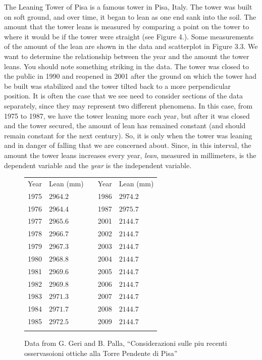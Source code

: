 \documentclass[10pt,]{book}
\theoremstyle{ptxdefinitionnotitle}
\theoremstyle{ptxdefinitiontitle}
\numberwithin{equation}{section}
\newcommand{\hrulemedium}{\noalign{\hrule height 0.07em}}
\begin{document}
\begin{example}\label{example-3}
\hypertarget{p-88}{}%
The Leaning Tower of Pisa is a famous tower in Pisa, Italy. The tower was built on soft ground, and over time, it began to lean as one end sank into the soil. The amount that the tower leans is measured by comparing a point on the tower to where it would be if the tower were straight (see Figure 4.). Some measurements of the amount of the lean are shown in the data and scatterplot in Figure 3.3. We want to determine the relationship between the year and the amount the tower leans. You should note something striking in the data. The tower was closed to the public in 1990 and reopened in 2001 after the ground on which the tower had be built was stabilized and the tower tilted back to a more perpendicular position. It is often the case that we see need to consider sections of the data separately, since they may represent two different phenomena. In this case, from 1975 to 1987, we have the tower leaning more each year, but after it was closed and the tower secured, the amount of lean has remained constant (and should remain constant for the next century). So, it is only when the tower was leaning and in danger of falling that we are concerned about. Since, in this interval, the amount the tower leans increases every year, \emph{lean}, measured in millimeters, is the dependent variable and the \emph{year} is the independent variable.%
\begin{figure}
\centering
\begin{tabular}{lllll}\hrulemedium
Year&Lean (mm)&&Year&Lean (mm)\tabularnewline\hrulemedium
1975&\(2964.2\)&&1986&\(2974.2\)\tabularnewline\hrulemedium
1976&\(2964.4\)&&1987&\(2975.7\)\tabularnewline\hrulemedium
1977&\(2965.6\)&&2001&\(2144.7\)\tabularnewline\hrulemedium
1978&\(2966.7\)&&2002&\(2144.7\)\tabularnewline\hrulemedium
1979&\(2967.3\)&&2003&\(2144.7\)\tabularnewline\hrulemedium
1980&\(2968.8\)&&2004&\(2144.7\)\tabularnewline\hrulemedium
1981&\(2969.6\)&&2005&\(2144.7\)\tabularnewline\hrulemedium
1982&\(2969.8\)&&2006&\(2144.7\)\tabularnewline\hrulemedium
1983&\(2971.3\)&&2007&\(2144.7\)\tabularnewline\hrulemedium
1984&\(2971.7\)&&2008&\(2144.7\)\tabularnewline\hrulemedium
1985&\(2972.5\)&&2009&\(2144.7\)\tabularnewline\hrulemedium
\end{tabular}
\caption{Data from G. Geri and B. Palla, ``Considerazioni sulle piu recenti osservasoioni ottiche alla Torre Pendente di Pisa''\label{tower-of-pisa-data}}
\end{figure}
\begin{figure}

\end{figure}
\end{example}
\end{document}
